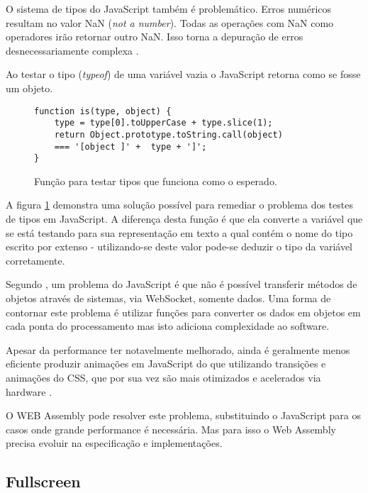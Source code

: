 O sistema de tipos do JavaScript também é problemático.
Erros numéricos resultam no valor NaN (\textit{not a number}).
Todas as operações com NaN como operadores irão retornar outro
NaN. Isso torna a depuração de erros desnecessariamente complexa
\autocite{html5mostwanted}.

Ao testar o tipo (\textit{typeof}) de uma variável vazia o JavaScript
retorna como se fosse um objeto.

\begin{figure}[H]
\centering
\begin{verbatim}
function is(type, object) {
    type = type[0].toUpperCase + type.slice(1);
    return Object.prototype.toString.call(object)
    === '[object ]' +  type + ']';
}
\end{verbatim}
\caption{Função para testar tipos que funciona como o esperado.}
\label{fig:fixJSTypes}
\end{figure}

A figura \ref{fig:fixJSTypes} demonstra uma solução possível para
remediar o problema dos testes de tipos em JavaScript. A diferença
desta função é que ela converte a variável que se está testando
para sua representação em texto a qual contém o nome do tipo escrito
por extenso - utilizando-se deste valor pode-se deduzir o tipo da
variável corretamente.

Segundo \cite{htmlResearchJournal}, um problema do JavaScript é que
não é possível transferir métodos de objetos através de sistemas,
via WebSocket, somente dados. Uma forma de contornar este problema é
utilizar funções para converter os dados em objetos em cada ponta do
processamento mas isto adiciona complexidade ao software.

Apesar da performance ter notavelmente melhorado, ainda é geralmente
menos eficiente produzir animações em JavaScript do que utilizando
transições e animações do CSS, que por sua vez são mais otimizados
e acelerados via hardware \autocite{html5mostwanted}.

O WEB Assembly pode resolver este problema, substituindo o JavaScript
para os casos onde grande performance é necessária. Mas para isso o
Web Assembly precisa evoluir na especificação e implementações.

\subsection{Fullscreen}

